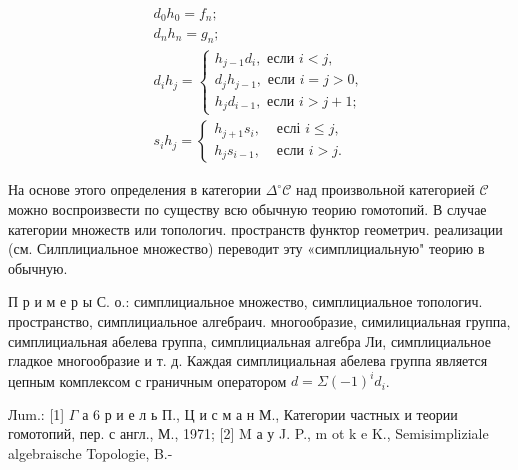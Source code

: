 \documentclass[10pt]{article}
\begin{document}
\[

\begin{gathered}

d_{0} h_{0}=f_{n} ; \\

d_{n} h_{n}=g_{n} ; \\

d_{i} h_{j}=\left\{\begin{array}{l}

h_{j-1} d_{i}, \text { если } i<j, \\

d_{j} h_{j-1}, \text { если } i=j>0, \\

h_{j} d_{i-1}, \text { если } i>j+1 ;

\end{array}\right. \\

s_{i} h_{j}=\left\{\begin{array}{lll}

h_{j+1} s_{i}, & \text { еслі } i \leqslant j, \\

h_{j} s_{i-1}, & \text { если } i>j .

\end{array}\right.

\end{gathered}

\]



На основе этого определения в категории $\Delta^{\circ} \mathscr{C}$ над произвольной категорией $\mathscr{C}$ можно воспроизвести по существу всю обычную теорию гомотопий. В случае категории множеств или топологич. пространств функтор геометрич. реализации (см. Силплициальное множество) переводит эту «симплициальную" теорию в обычную.



П р и м е р ы С. о.: симплициальное множество, симплициальное топологич. пространство, симплициальное алгебраич. многообразие, симилициальная группа, симплициальная абелева группа, симплициальная алгебра Ли, симплициальное гладкое многообразие и т. д. Каждая симплициальная абелева группа является цепным комплексом с граничным оператором $d=\Sigma(-1)^{i} d_{i}$.



Лum.: [1] $\Gamma$ а 6 р и е л ь П., Ц и с м а н М., Категории частных и теории гомотопий, пер. с англ., М., 1971; [2] M а у J. P., $\mathrm{m}$ ot $\mathrm{k}$ e K., Semisimpliziale algebraische Topologie, B.-
\end{document}
